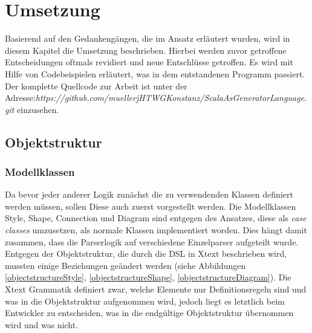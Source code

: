 \chapter{Umsetzung}
Basierend auf den Gedankengängen, die im Ansatz erläutert wurden, wird in diesem Kapitel die Umsetzung beschrieben. Hierbei werden zuvor getroffene Entscheidungen oftmals revidiert und neue Entschlüsse getroffen. Es wird mit Hilfe von Codebeispielen erläutert, was in dem entstandenen Programm passiert. Der komplette Quellcode zur Arbeit ist unter der Adresse:\linebreak\textit{https://github.com/muellerjHTWGKonstanz/ScalaAsGeneratorLanguage.git} \linebreak einzusehen.
\section{Objektstruktur}
\subsection{Modellklassen}
Da bevor jeder anderer Logik zunächst die zu verwendenden Klassen definiert werden müssen, sollen Diese auch zuerst vorgestellt werden.
Die Modellklassen Style, Shape, Connection und Diagram sind entgegen des Ansatzes, diese als \textit{case classes} umzusetzen, als normale Klassen implementiert worden. Dies hängt damit zusammen, dass die Parserlogik auf verschiedene Einzelparser aufgeteilt wurde.
Entgegen der Objektstruktur, die durch die DSL in Xtext beschrieben wird, mussten einige Beziehungen geändert werden (siehe Abbildungen \ref{objectstructureStyle}, \ref{objectstructureShape}, \ref{objectstructureDiagram}).
Die Xtext Grammatik definiert zwar, welche Elemente nur Definitionsregeln sind und was in die Objektstruktur aufgenommen wird, jedoch liegt es letztlich beim Entwickler zu entscheiden, was in die endgültige Objektstruktur übernommen wird und was nicht.
